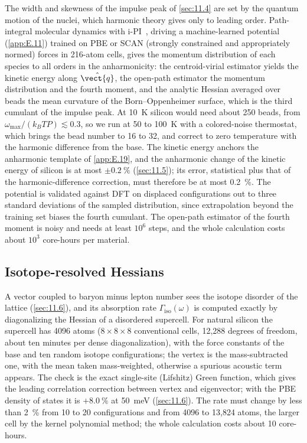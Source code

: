 The width and skewness of the impulse peak of \cref{sec:11.4} are set by the quantum motion of the nuclei, which harmonic theory gives only to leading order. Path-integral molecular dynamics with i-PI~\cite{kapil2019ipi}, driving a machine-learned potential (\cref{app:E.11}) trained on PBE or SCAN (strongly constrained and appropriately normed) forces in 216-atom cells, gives the momentum distribution of each species to all orders in the anharmonicity: the centroid-virial estimator yields the kinetic energy along $\hat{\vect{q}}$, the open-path estimator the momentum distribution and the fourth moment, and the analytic Hessian averaged over beads the mean curvature of the Born--Oppenheimer surface, which is the third cumulant of the impulse peak. At \SI{10}{K} silicon would need about 250 beads, from $\omega_{\mathrm{max}}/(k_BTP) \lesssim 0.3$, so we run at 50 to \SI{100}{K} with a colored-noise thermostat, which brings the bead number to 16 to 32, and correct to zero temperature with the harmonic difference from the base. The kinetic energy anchors the anharmonic template of \cref{app:E.19}, and the anharmonic change of the kinetic energy of silicon is at most $\pm\SI{0.2}{\percent}$ (\cref{sec:11.5}); its error, statistical plus that of the harmonic-difference correction, must therefore be at most \SI{0.2}{\percent}. The potential is validated against DFT on displaced configurations out to three standard deviations of the sampled distribution, since extrapolation beyond the training set biases the fourth cumulant. The open-path estimator of the fourth moment is noisy and needs at least $10^6$ steps, and the whole calculation costs about $10^3$ core-hours per material.

\subsection{Isotope-resolved Hessians}

A vector coupled to baryon minus lepton number sees the isotope disorder of the lattice (\cref{sec:11.6}), and its absorption rate $\varGamma_{\mathrm{iso}}(\omega)$ is computed exactly by diagonalizing the Hessian of a disordered supercell. For natural silicon the supercell has 4096 atoms ($8\times8\times8$ conventional cells, 12{,}288 degrees of freedom, about ten minutes per dense diagonalization), with the force constants of the base and ten random isotope configurations; the vertex is the mass-subtracted one, with the mean taken mass-weighted, otherwise a spurious acoustic term appears. The check is the exact single-site (Lifshitz) Green function, which gives the leading correlation correction between vertex and eigenvector; with the PBE density of states it is $+\SI{8.0}{\percent}$ at \SI{50}{meV} (\cref{sec:11.6}). The rate must change by less than \SI{2}{\percent} from 10 to 20 configurations and from 4096 to 13{,}824 atoms, the larger cell by the kernel polynomial method; the whole calculation costs about 10 core-hours.

